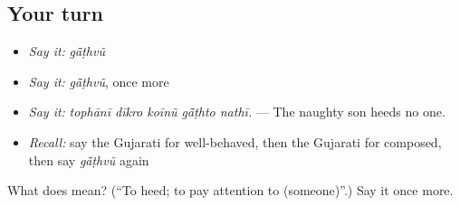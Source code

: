 \subsection*{Your turn}
\begin{itemize}
\raggedright
  \item \emph{Say it:} \emph{gā̃ṭhvũ}
  \item \emph{Say it:} \emph{gā̃ṭhvũ}, once more
  \item \emph{Say it:} \emph{tophānī dīkro koīnũ gā̃ṭhto nathī.} — The naughty son heeds no one.
  \item \emph{Recall:} say the Gujarati for well-behaved, then the Gujarati for composed, then say \emph{gā̃ṭhvũ} again
\end{itemize}

\begin{tcolorbox}[breakable,colback=teal!4,colframe=teal!35!black,title={Before you move on}]
What does  mean? (\textquotedblleft{}To heed; to pay attention to (someone)\textquotedblright{}.) Say it once more.
\end{tcolorbox}
